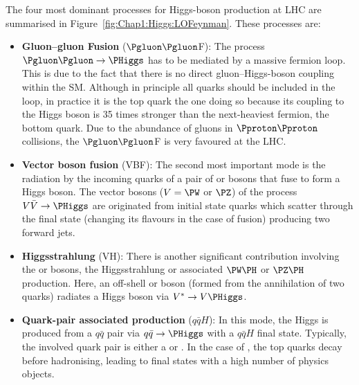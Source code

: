 The four most dominant processes for Higgs-boson production at LHC are 
summarised in Figure~\ref{fig:Chap1:Higgs:LOFeynman}. These processes are:
\begin{itemize}
  \item \textbf{Gluon--gluon Fusion} ($\Pgluon \Pgluon$F): 
				The process 
				$\Pgluon \Pgluon \rightarrow \PHiggs$ has to be mediated by a massive fermion loop. This is due to the fact that
				there is no direct gluon--Higgs-boson coupling within the SM.
				Although in principle all quarks should be included in the
				loop, in practice it is the top quark the one doing so because its coupling to the Higgs boson is 35 times stronger
				than the next-heaviest fermion, the bottom quark.
				Due to the abundance of gluons in $\Pproton \Pproton$ collisions, the $\Pgluon \Pgluon$F is very favoured at the LHC.
				
				
							
  \item \textbf{Vector boson fusion} (VBF): 
  				The second most important mode is the radiation by the incoming quarks of a pair of
				\PW or \PZ bosons that fuse to 
  				form a Higgs boson. %
				The vector bosons ($V=\PW$ or $\PZ$) of
				the process $V\bar{V}\rightarrow \PHiggs$ are originated from initial state quarks which scatter
				through the final state (changing its flavours in the case of \PW fusion) producing two forward jets.

  \item \textbf{Higgsstrahlung} (VH): 
  				There is another significant contribution involving the \PW or \PZ bosons, the Higgsstrahlung or associated 
				$\PW\PH$ or $\PZ\PH$ production. Here, an off-shell \PW or \PZ boson (formed from the annihilation of two 
				quarks) radiates a Higgs boson via $V^{*} \rightarrow V\PHiggs$. 
				
  \item \textbf{Quark-pair associated production} ($q\bar{q}H$): 
  				In this mode, the Higgs is produced from a $q\bar{q}$ pair via $q\bar{q}\rightarrow \PHiggs$ with a $q\bar{q}H$
				final state. Typically, the involved quark pair is either a \bbbar or \ttbar. In the case of \ttbar, 
				the top quarks decay before hadronising, leading
				to final states with a high number of physics objects.
				

\end{itemize}
